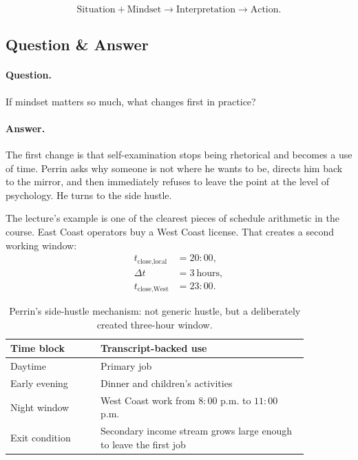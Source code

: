 \documentclass[11pt,oneside]{book}
\begin{document}
\begin{equation}
\text{Situation} + \text{Mindset} \to \text{Interpretation} \to \text{Action}.
\end{equation}

\subsection{Question \& Answer}

\paragraph{Question.}
If mindset matters so much, what changes first in practice?

\paragraph{Answer.}
The first change is that self-examination stops being rhetorical and becomes a use of time. Perrin asks why someone is not where he wants to be, directs him back to the mirror, and then immediately refuses to leave the point at the level of psychology. He turns to the side hustle.

The lecture's example is one of the clearest pieces of schedule arithmetic in the course. East Coast operators buy a West Coast license. That creates a second working window:
\begin{align}
t_{\text{close,local}} &= 20{:}00,\\
\Delta t &= 3\ \text{hours},\\
t_{\text{close,West}} &= 23{:}00.
\end{align}

\begin{table}[h]
\centering
\small
\begin{tabular}{p{0.26\linewidth}p{0.60\linewidth}}
\hline
Time block & Transcript-backed use \\
\hline
Daytime & Primary job \\
Early evening & Dinner and children's activities \\
Night window & West Coast work from \(8{:}00\) p.m. to \(11{:}00\) p.m. \\
Exit condition & Secondary income stream grows large enough to leave the first job \\
\hline
\end{tabular}
\caption{Perrin's side-hustle mechanism: not generic hustle, but a deliberately created three-hour window.}
\end{table}
\end{document}
